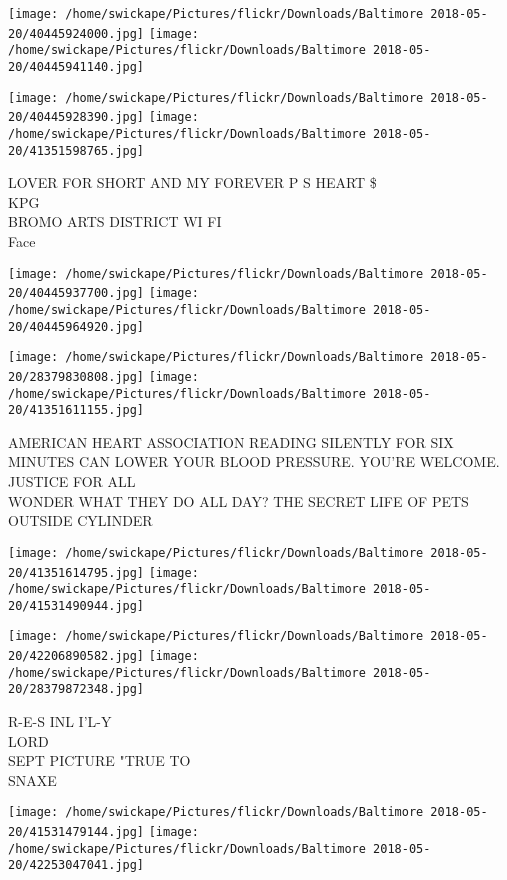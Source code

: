 \documentclass[10pt,letterpaper]{article}
\begin{document}
\texttt{[image: /home/swickape/Pictures/flickr/Downloads/Baltimore 2018-05-20/40445924000.jpg]}
\texttt{[image: /home/swickape/Pictures/flickr/Downloads/Baltimore 2018-05-20/40445941140.jpg]}

\texttt{[image: /home/swickape/Pictures/flickr/Downloads/Baltimore 2018-05-20/40445928390.jpg]}
\texttt{[image: /home/swickape/Pictures/flickr/Downloads/Baltimore 2018-05-20/41351598765.jpg]}

LOVER FOR SHORT AND MY FOREVER P S HEART \$\\
KPG\\
BROMO ARTS DISTRICT WI FI\\
Face\\
\pagebreak

\texttt{[image: /home/swickape/Pictures/flickr/Downloads/Baltimore 2018-05-20/40445937700.jpg]}
\texttt{[image: /home/swickape/Pictures/flickr/Downloads/Baltimore 2018-05-20/40445964920.jpg]}

\texttt{[image: /home/swickape/Pictures/flickr/Downloads/Baltimore 2018-05-20/28379830808.jpg]}
\texttt{[image: /home/swickape/Pictures/flickr/Downloads/Baltimore 2018-05-20/41351611155.jpg]}

AMERICAN HEART ASSOCIATION READING SILENTLY FOR SIX MINUTES CAN LOWER YOUR BLOOD PRESSURE.  YOU'RE WELCOME.\\
JUSTICE FOR ALL\\
WONDER WHAT THEY DO ALL DAY?  THE SECRET LIFE OF PETS\\
OUTSIDE CYLINDER\\
\pagebreak

\texttt{[image: /home/swickape/Pictures/flickr/Downloads/Baltimore 2018-05-20/41351614795.jpg]}
\texttt{[image: /home/swickape/Pictures/flickr/Downloads/Baltimore 2018-05-20/41531490944.jpg]}

\texttt{[image: /home/swickape/Pictures/flickr/Downloads/Baltimore 2018-05-20/42206890582.jpg]}
\texttt{[image: /home/swickape/Pictures/flickr/Downloads/Baltimore 2018-05-20/28379872348.jpg]}

R{-}E{-}S INL I'L{-}Y\\
LORD\\
SEPT PICTURE "TRUE TO\\
SNAXE\\
\pagebreak

\texttt{[image: /home/swickape/Pictures/flickr/Downloads/Baltimore 2018-05-20/41531479144.jpg]}
\texttt{[image: /home/swickape/Pictures/flickr/Downloads/Baltimore 2018-05-20/42253047041.jpg]}
\end{document}
